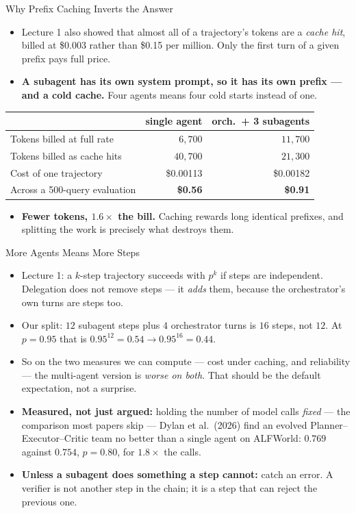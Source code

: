 \begin{frame}{Why Prefix Caching Inverts the Answer}
\small
\begin{itemize}
  \item Lecture 1 also showed that almost all of a trajectory's tokens are a \emph{cache hit}, billed at \$0.003 rather than \$0.15 per million. Only the first turn of a given prefix pays full price.
  \pause
  \item \textbf{A subagent has its own system prompt, so it has its own prefix --- and a cold cache.} Four agents means four cold starts instead of one.
\end{itemize}
\pause
\centering
\footnotesize
\begin{tabular}{l|rr}
 & \textbf{single agent} & \textbf{orch.\ + 3 subagents} \\
\hline
Tokens billed at full rate & $6{,}700$  & $11{,}700$ \\
Tokens billed as cache hits & $40{,}700$ & $21{,}300$ \\
Cost of one trajectory      & \$0.00113  & \$0.00182 \\
Across a 500-query evaluation & \textbf{\$0.56} & \textbf{\$0.91} \\
\end{tabular}

\vspace{0.4em}
\small
\begin{itemize}
  \item \textbf{Fewer tokens, $1.6\times$ the bill.} Caching rewards long identical prefixes, and splitting the work is precisely what destroys them.
\end{itemize}
\end{frame}

\begin{frame}{More Agents Means More Steps}
\begin{itemize}
  \item Lecture 1: a $k$-step trajectory succeeds with $p^{k}$ if steps are independent. Delegation does not remove steps --- it \emph{adds} them, because the orchestrator's own turns are steps too.
  \pause
  \item Our split: $12$ subagent steps plus $4$ orchestrator turns is $16$ steps, not $12$. At $p = 0.95$ that is $0.95^{12} = 0.54 \longrightarrow 0.95^{16} = 0.44$.
  \pause
  \item So on the two measures we can compute --- cost under caching, and reliability --- the multi-agent version is \emph{worse on both}. That should be the default expectation, not a surprise.
  \pause
  \item \textbf{Measured, not just argued:} holding the number of model calls \emph{fixed} --- the comparison most papers skip --- Dylan et al.\ (2026) find an evolved Planner--Executor--Critic team no better than a single agent on ALFWorld: $0.769$ against $0.754$, $p = 0.80$, for $1.8\times$ the calls.
  \pause
  \item \textbf{Unless a subagent does something a step cannot:} catch an error. A verifier is not another step in the chain; it is a step that can reject the previous one.
\end{itemize}
\end{frame}

